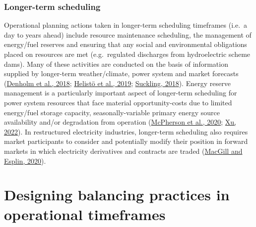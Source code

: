 \documentclass[12pt,a4paper,]{report}
\begin{document}
\hypertarget{longer-term-scheduling}{%
\subsubsection{Longer-term scheduling}\label{longer-term-scheduling}}

Operational planning actions taken in longer-term scheduling timeframes
(i.e.~a day to years ahead) include resource maintenance scheduling, the
management of energy/fuel reserves and ensuring that any social and
environmental obligations placed on resources are met (e.g.~regulated
discharges from hydroelectric scheme dams). Many of these activities are
conducted on the basis of information supplied by longer-term
weather/climate, power system and market forecasts
(\protect\hyperlink{ref-denholmHowLowCan2018}{Denholm et al., 2018};
\protect\hyperlink{ref-helistoIncludingOperationalAspects2019}{Helistö
et al., 2019};
\protect\hyperlink{ref-sucklingSeasonaltoDecadalClimateForecasting2018}{Suckling,
2018}). Energy reserve management is a particularly important aspect of
longer-term scheduling for power system resources that face material
opportunity-costs due to limited energy/fuel storage capacity,
seasonally-variable primary energy source availability and/or
degradation from operation
(\protect\hyperlink{ref-mcphersonImpactsStorageDispatch2020}{McPherson
et al., 2020}; \protect\hyperlink{ref-xuRoleModelingBattery2022}{Xu,
2022}). In restructured electricity industries, longer-term scheduling
also requires market participants to consider and potentially modify
their position in forward markets in which electricity derivatives and
contracts are traded
(\protect\hyperlink{ref-macgillEndtoendElectricityMarket2020}{MacGill
and Esplin, 2020}).

\hypertarget{sec:lit_review-design}{%
\section{Designing balancing practices in operational
timeframes}\label{sec:lit_review-design}}
\end{document}
